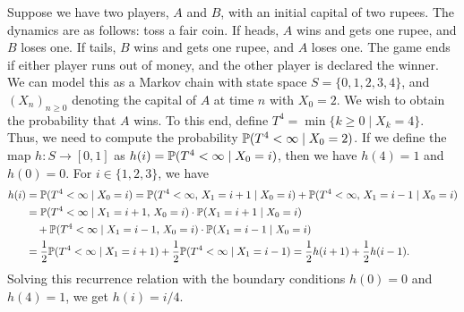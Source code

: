 Suppose we have two players, $A$ and $B$, with an initial capital of two rupees. The dynamics are as follows: toss a fair coin. If heads, $A$ wins and gets one rupee, and $B$ loses one. If tails, $B$ wins and gets one rupee, and $A$ loses one. The game ends if either player runs out of money, and the other player is declared the winner. We can model this as a Markov chain with state space $S = \{0,1,2,3,4\}$, and $(X_{n})_{n \geq 0}$ denoting the capital of $A$ at time $n$ with $X_{0} = 2$. We wish to obtain the probability that $A$ wins. To this end, define $T^{4} = \min\{k \geq 0 \mid X_{k} = 4\}$. Thus, we need to compute the probability $\mathbb{P}(T^{4} < \infty \mid X_{0}=2)$. If we define the map $h:S \to [0,1]$ as $h(i) = \mathbb{P}(T^{4} < \infty \mid X_{0}=i)$, then we have $h(4) = 1$ and $h(0) = 0$. For $i \in \{1,2,3\}$, we have
\begin{align}
    h(i) &= \mathbb{P}(T^{4} < \infty \mid X_{0}=i) = \mathbb{P}(T^{4} < \infty, \, X_{1}=i+1 \mid X_{0}=i) + \mathbb{P}(T^{4} < \infty, \, X_{1}=i-1 \mid X_{0}=i) \notag \\
    &= \mathbb{P}(T^{4} < \infty \mid X_{1}=i+1, \, X_{0}=i) \cdot \mathbb{P}(X_{1}=i+1 \mid X_{0}=i) \notag \\ &\quad + \mathbb{P}(T^{4} < \infty \mid X_{1}=i-1, \, X_{0}=i) \cdot \mathbb{P}(X_{1}=i-1 \mid X_{0}=i) \notag \\
    &= \frac{1}{2}\mathbb{P}(T^{4} < \infty \mid X_{1}=i+1) + \frac{1}{2} \mathbb{P}(T^{4} < \infty \mid X_{1}=i-1) = \frac{1}{2}h(i+1) + \frac{1}{2}h(i-1).
\end{align}
Solving this recurrence relation with the boundary conditions $h(0) = 0$ and $h(4) = 1$, we get $h(i) = i/4$.
\\

